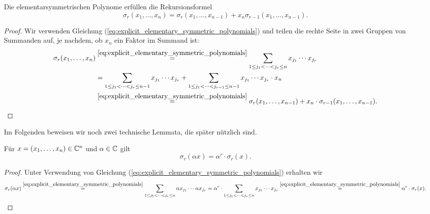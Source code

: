 \begin{lemma}
    \label{lemma:recursion_elementary_symmetric_polynomials}
    Die elementarsymmetrischen Polynome erfüllen die Rekursionsformel
    \begin{equation}
        \label{eq:recursion_elementary_symmetric_polynomials}
        \sigma_r (x_1, \dots, x_{n}) = \sigma_r (x_1, \dots, x_{n-1}) + x_{n} \sigma_{r-1} (x_1, \dots, x_{n-1}).
    \end{equation}
\end{lemma}
\begin{proof}
    Wir verwenden Gleichung (\ref{eq:explicit_elementary_symmetric_polynomials})
    und teilen die rechte Seite in zwei Gruppen von Summanden auf, je nachdem,
    ob $x_n$ ein Faktor im Summand ist:
    \begin{equation*}
        \begin{split}
            \sigma_r (x_1, \dots, x_{n})
            &\overset{\eqref{eq:explicit_elementary_symmetric_polynomials}}=
                \sum_{1 \leq j_1 < \dots < j_r \leq n} x_{j_1} \cdots x_{j_r}\\
            &= \sum_{1 \leq j_1 < \dots < j_r \leq n-1} x_{j_1} \cdots x_{j_r}
            + \sum_{1 \leq j_1 < \dots < j_{r-1} \leq n-1} x_{j_1} \cdots x_{j_r} \cdot x_{n}\\
            &\overset{\eqref{eq:explicit_elementary_symmetric_polynomials}}=
                \sigma_r (x_1, \dots, x_{n-1}) + x_{n} \cdot \sigma_{r-1} (x_1, \dots, x_{n-1}).
        \end{split}
    \end{equation*}
\end{proof}

\noindent Im Folgenden beweisen wir noch zwei technische Lemmata, die später
nützlich sind.

\begin{lemma}
    \label{lemma:elementary_symmetric_polynomials_const_multiplication}
    Für $x = (x_1, \dots, x_n) \in \mathbb{C}^n$ und $\alpha \in \mathbb{C}$ gilt
    \begin{equation}
        \label{eq:elementary_symmetric_polynomials_const_multiplication}
        \sigma_{r}(\alpha x)
        = \alpha^{r} \cdot \sigma_{r}(x).
    \end{equation}
\end{lemma}
\begin{proof}
    Unter Verwendung von Gleichung
    (\ref{eq:explicit_elementary_symmetric_polynomials})
    erhalten wir
    \[
        \sigma_{r}(\alpha x)
        \overset{\eqref{eq:explicit_elementary_symmetric_polynomials}}=
            \sum_{1 \leq j_1 < \dots < j_r \leq n} \alpha x_{j_1} \cdots \alpha x_{j_r}
        = \alpha^r \cdot \sum_{1 \leq j_1 < \dots < j_r \leq n} x_{j_1} \cdots x_{j_r}
        \overset{\eqref{eq:explicit_elementary_symmetric_polynomials}}=
            \alpha^r \cdot \sigma_{r}(x).
    \]
\end{proof}


